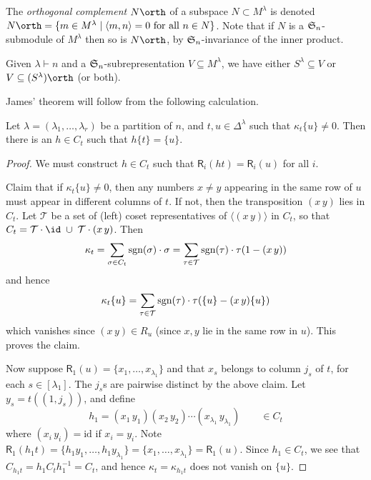 The \emph{orthogonal complement} $N\orth$ of a subspace $N\subset M^\lambda$ is
denoted $N\orth = \{m\in M^\lambda\;|\; \langle m,n\rangle = 0 \text{ for all }n\in N\}$. Note that if $N$ is a $\mathfrak{S}_{n}$-submodule of $M^\lambda$ then so is $N\orth$,
by $\mathfrak{S}_{n}$-invariance of the inner product. 

\begin{theorem}
    Given $\lambda \vdash n$ and a $\mathfrak{S}_{n}$-subrepresentation $V\subseteq M^\lambda$,
    we have either $S^\lambda\subseteq V$ or $V\subseteq (S^{\lambda})\orth$ (or
    both).
\end{theorem}

James' theorem will follow from the following calculation.

\begin{lemma}
    \label{lem:technical1}
    Let $\lambda=(\lambda_1,\ldots, \lambda_r)$ be a partition of $n$, and
    $t,u\in \Delta^\lambda$ such that $\kappa_t\{u\}\neq 0$. Then there is an
    $h\in C_t$ such that $h\{t\}=\{u\}$.

    \begin{proof}
        We must construct $h\in C_t$ such that
        $\mathsf{R}_i(ht)=\mathsf{R}_i(u)$ for all $i$. 

        Claim that if $\kappa_t\{u\}\neq 0$, then any
        numbers $x\neq y$ appearing in the same row of $u$ must appear in
        different columns of $t$. If not, then the transposition $(x\,y)$ lies
        in $C_t$. Let $\mathcal{T}$ be a set of (left) coset representatives of
        $\langle (x\,y)\rangle$ in $C_t$, so that $C_t=\mathcal{T}\cdot \id
        \;\cup\; \mathcal{T}\cdot (x\,y)$. Then 
        \[\kappa_t = \sum_{\sigma\in C_t}\textnormal{sgn}(\sigma)\cdot\sigma = \sum_{\tau\in
        \mathcal{T}}\textnormal{sgn}(\tau)\cdot \tau(1-(x\,y))\]
        and hence
        \[\kappa_t\{u\}=\sum_{\tau\in\mathcal{T}}\textnormal{sgn}(\tau)\cdot
        \tau(\{u\}-(x\,y)\{u\})\]
        which vanishes since $(x\,y)\in R_u$ (since $x,y$ lie in the same row in
        $u$). This proves the claim.

        Now suppose $\mathsf{R}_1(u)=\{x_1,\ldots,x_{\lambda_1}\}$ and that $x_s$ belongs
        to column $j_s$ of $t$, for each $s\in [\lambda_1]$. The $j_s$s are
        pairwise distinct by the above claim. Let $y_s=t((1,j_s))$, and define
        \[h_1=(x_1\,y_1)(x_2\,y_2)\cdots(x_{\lambda_1}\,y_{\lambda_1}) \qquad
        \in C_t\] 
        where $(x_i\,y_i)=\text{id}$ if $x_i=y_i$.
        Note $\mathsf{R}_1(h_1 t)=\{h_1y_1, \ldots, h_1y_{\lambda_1}\} =
        \{x_1,\ldots,x_{\lambda_1}\}=\mathsf{R}_1(u)$. Since $h_1\in C_t$, we see that
        $C_{h_1t}=h_1C_th_1^{-1}=C_t$, and hence $\kappa_t=\kappa_{h_1t}$ does
        not vanish on $\{u\}$.


\end{proof}
\end{lemma}
